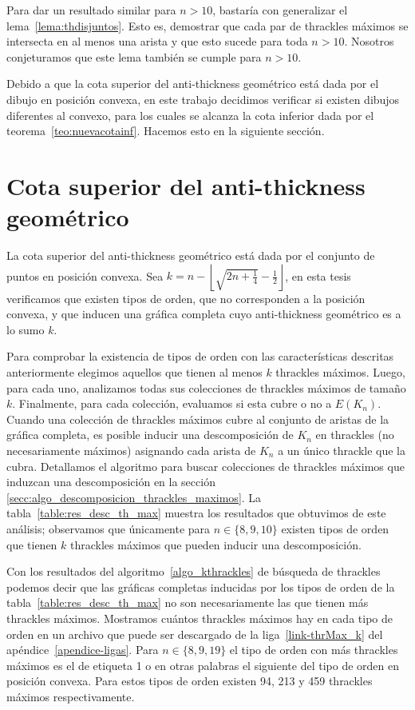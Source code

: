     Para dar un resultado similar para $n > 10$, bastaría con generalizar el
    lema~\ref{lema:thdisjuntos}. Esto es, demostrar que cada par de thrackles máximos se
    intersecta en al menos una arista y que esto sucede para toda $n > 10$. Nosotros
    conjeturamos que este lema también se cumple para $n>10$.

    Debido a que la cota superior del anti-thickness geométrico está dada por
    el dibujo en posición convexa, en este trabajo decidimos verificar si existen
    dibujos diferentes al convexo, para los cuales se alcanza la cota inferior
    dada por el teorema~\ref{teo:nuevacotainf}. Hacemos esto en la siguiente sección.

\section{Cota superior del anti-thickness geométrico}\label{secc:descomposicion_thrackles_maximos}

  La cota superior del anti-thickness geométrico está dada por el conjunto
  de puntos en posición convexa. Sea $k=n - \left\lfloor\sqrt{2n+\frac{1}{4}} -
  \frac{1}{2}\right\rfloor$, en esta tesis verificamos que existen tipos de
  orden, que no corresponden a la posición convexa, y que inducen una gráfica
  completa cuyo anti-thickness geométrico es a lo sumo $k$.

  Para comprobar la existencia de tipos de orden con las características descritas
  anteriormente elegimos aquellos que tienen al menos $k$ thrackles
  máximos. Luego, para cada uno, analizamos todas sus colecciones de thrackles
  máximos de tamaño $k$. Finalmente, para cada colección, evaluamos si
  esta cubre o no a $E(K_n)$. Cuando una colección de thrackles máximos cubre
  al conjunto de aristas de la gráfica completa, es posible inducir una descomposición
  de $K_n$ en thrackles (no necesariamente máximos) asignando cada arista de $K_n$
  a un único thrackle que la cubra. Detallamos el algoritmo para buscar
  colecciones de thrackles máximos que induzcan una descomposición en la sección
  \ref{secc:algo_descomposicion_thrackles_maximos}. La tabla~\ref{table:res_desc_th_max}
  muestra los resultados que obtuvimos de este análisis; observamos que únicamente para
  $n\in \{8,9,10\}$ existen tipos de orden que tienen $k$ thrackles máximos que
  pueden inducir una descomposición.

  Con los resultados del algoritmo~\ref{algo_kthrackles} de búsqueda de thrackles podemos decir que
  las gráficas completas inducidas por los tipos de orden de la tabla~\ref{table:res_desc_th_max}
  no son necesariamente las que tienen más thrackles máximos. Mostramos cuántos thrackles máximos
  hay en cada tipo de orden en un archivo que puede ser descargado de la liga~\ref{link-thrMax_k}
  del apéndice~\ref{apendice-ligas}. Para $n\in\{8,9,19\}$ el tipo de orden con más thrackles
  máximos es el de etiqueta 1 o en otras palabras el siguiente del tipo de orden en posición
  convexa. Para estos tipos de orden existen 94, 213 y 459 thrackles máximos respectivamente.

